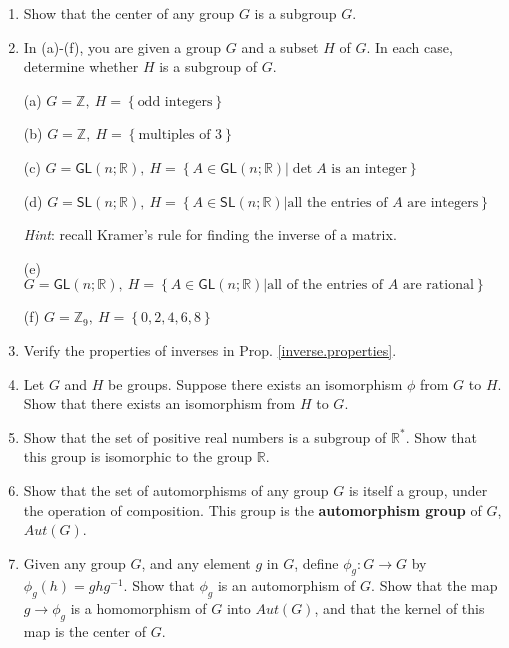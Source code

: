 \documentclass{amsbook}
\theoremstyle{plain}
\numberwithin{equation}{chapter}
\numberwithin{theorem}{chapter}
\begin{document}
\begin{enumerate}
\item  Show that the center of any group $G$ is a subgroup $G$.

\item \label{subgroups}In (a)-(f), you are given a group $G$ and a subset $H$
of $G$. In each case, determine whether $H$ is a subgroup of $G$.

(a) $G=\mathbb{Z},\ H=\left\{  \text{odd integers}\right\}  $

(b) $G=\mathbb{Z},\ H=\left\{  \text{multiples of 3}\right\}  $

(c) $G=\mathsf{GL}(n;\mathbb{R}),\ H=\left\{  A\in\mathsf{GL}(n;\mathbb{R}%
)\left|  \det A\text{ is an integer}\right.  \right\}  $

(d) $G=\mathsf{SL}(n;\mathbb{R}),\ H=\left\{  A\in\mathsf{SL}(n;\mathbb{R}%
)\left|  \text{all the entries of }A\text{ are integers}\right.  \right\}  $

\textit{Hint}: recall Kramer's rule for finding the inverse of a matrix.

(e) $G=\mathsf{GL}(n;\mathbb{R}),\ H=\left\{  A\in\mathsf{GL}(n;\mathbb{R}%
)\left|  \text{all of the entries of }A\text{ are rational}\right.  \right\}  $

(f) $G=\mathbb{Z}_{9},\ H=\left\{  0,2,4,6,8\right\}  $

\item \label{inverses}Verify the properties of inverses in Prop.
\ref{inverse.properties}.

\item \label{isomorphisms}Let $G$ and $H$ be groups. Suppose there exists an
isomorphism $\phi$ from $G$ to $H$. Show that there exists an isomorphism from
$H$ to $G$.

\item  Show that the set of positive real numbers is a subgroup of
$\mathbb{R}^{\ast}$. Show that this group is isomorphic to the group
$\mathbb{R}$.

\item  Show that the set of automorphisms of any group $G$ is itself a group,
under the operation of composition. This group is the \textbf{automorphism
group} of $G$, $Aut(G)$.

\item \label{inner}Given any group $G$, and any element $g$ in $G$, define
$\phi_{g}:G\rightarrow G$ by $\phi_{g}(h)=ghg^{-1}$. Show that $\phi_{g}$ is
an automorphism of $G$. Show that the map $g\rightarrow\phi_{g}$ is a
homomorphism of $G$ into $Aut(G)$, and that the kernel of this map is the
center of $G$.


\end{enumerate}
\end{document}
